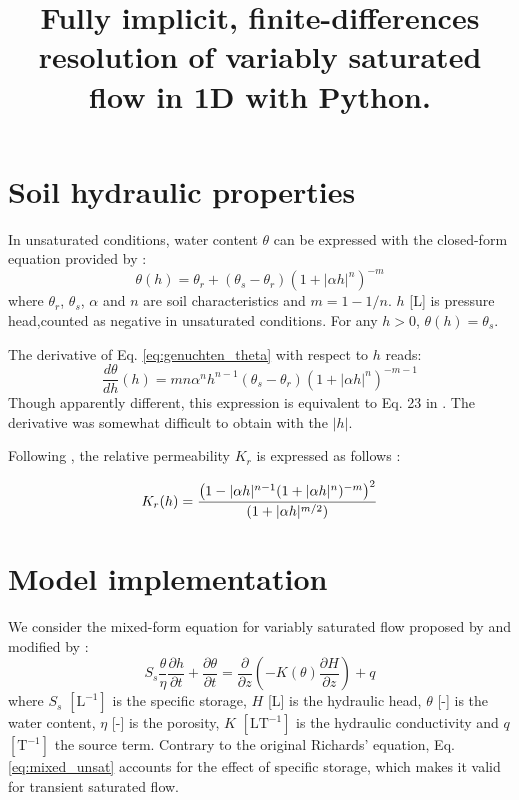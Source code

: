 \documentclass[a4paper,12pt]{article}
\title{Fully implicit, finite-differences resolution of variably saturated flow in 1D  with Python.}
\author{}
\begin{document}
\maketitle

\section{Soil hydraulic properties}

In unsaturated conditions, water content $\theta$ can be expressed with the closed-form equation provided by \cite{Genuchten1980} :
\begin{equation}
    \theta(h) =  \theta_r + (\theta_s - \theta_r) \left( 1+ |\alpha h|^n \right)^{-m}
    \label{eq:genuchten_theta}
\end{equation}
where $\theta_r$, $\theta_s$, $\alpha$ and $n$ are soil characteristics and $m = 1- 1/n$. $h$ [L] is pressure head,counted as negative in unsaturated conditions. For any $h>0$, $\theta(h) = \theta_s$.

The derivative of Eq. \ref{eq:genuchten_theta} with respect to $h$ reads: 
\begin{equation}
    \frac{d\theta}{dh}(h) = m n \alpha^n h^{n-1} 
       (\theta_s - \theta_r) \left( 1+ |\alpha h|^n \right)^{-m-1}
    \label{eq:dtheta_dh}
\end{equation}
Though apparently different, this expression is equivalent to Eq. 23 in \cite{Genuchten1980}. The derivative was somewhat difficult to obtain with the $|h|$.

Following \citep{Genuchten1980}, the relative permeability $K_r$ is expressed as follows \citep{Genuchten1980}:


\begin{equation}
    K_r(h) = { { \left( 1-|\alpha h|^{n-1} (1+|\alpha h|^n)^{-m} \right)^2 } \over
		{ (1+ |\alpha h|^{m/2} ) } }
    \label{eq:K_r}
\end{equation}


\section{Model implementation}

We consider the mixed-form equation for variably saturated flow proposed by \citep{Celiaetal1990} and modified by \cite{Clementetal1994}:
\begin{equation}
    S_s \frac{\theta}{\eta} \frac{\partial h}{\partial t} + \frac{\partial \theta}{\partial t} = 
    \frac{\partial}{\partial z} \left(-K(\theta) \frac{\partial H}{\partial z} \right) + q
    \label{eq:mixed_unsat}
\end{equation}
where $S_s$ $\mathrm{[L^{-1}]}$ is the specific storage, $H$ [L] is the hydraulic head, $\theta$ [-] is the water content, $\eta$ [-] is the porosity, $K$ $\mathrm{[LT^{-1}]}$ is the hydraulic conductivity and $q$ $\mathrm{[T^{-1}]}$ the source term. Contrary to the original Richards' equation, Eq. \ref{eq:mixed_unsat} accounts for the effect of specific storage, which makes it valid for transient saturated flow.
\end{document}
